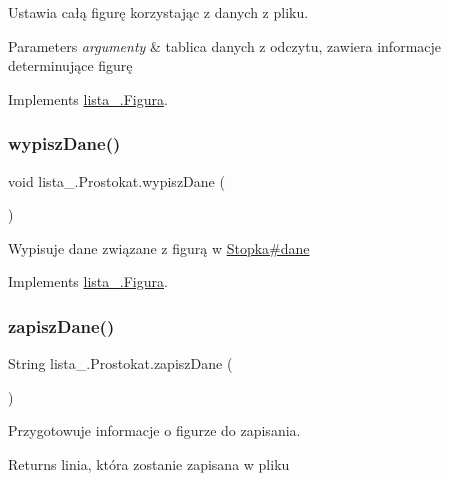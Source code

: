 Ustawia całą figurę korzystając z danych z pliku. 
\begin{DoxyParams}{Parameters}
{\em argumenty} & tablica danych z odczytu, zawiera informacje determinujące figurę\\
\hline
\end{DoxyParams}
 

Implements \mbox{\hyperlink{interfacelista__5_1_1_figura_a75b72b51014348d839e1f2b81525f264}{lista\+\_.\+Figura}}.

\mbox{\label{classlista__5_1_1_prostokat_a95b9ce7b2a7b095c43ffc843cfeff39a}} 
\subsubsection{\texorpdfstring{wypisz\+Dane()}{wypiszDane()}}
{\footnotesize\ttfamily void lista\+\_.\+Prostokat.\+wypisz\+Dane (\begin{DoxyParamCaption}{ }\end{DoxyParamCaption})}

Wypisuje dane związane z figurą w \mbox{\hyperlink{classlista__5_1_1_stopka_a8e8ef21758defd5b137e609b00d2f59e}{Stopka\#dane}} 

Implements \mbox{\hyperlink{interfacelista__5_1_1_figura_aaddd90c61fd1632655cb031efafe1a7d}{lista\+\_.\+Figura}}.

\mbox{\label{classlista__5_1_1_prostokat_a9537add38b8302420692068fb36726b5}} 
\subsubsection{\texorpdfstring{zapisz\+Dane()}{zapiszDane()}}
{\footnotesize\ttfamily String lista\+\_.\+Prostokat.\+zapisz\+Dane (\begin{DoxyParamCaption}{ }\end{DoxyParamCaption})}

Przygotowuje informacje o figurze do zapisania. \begin{DoxyReturn}{Returns}
linia, która zostanie zapisana w pliku
\end{DoxyReturn}
 

